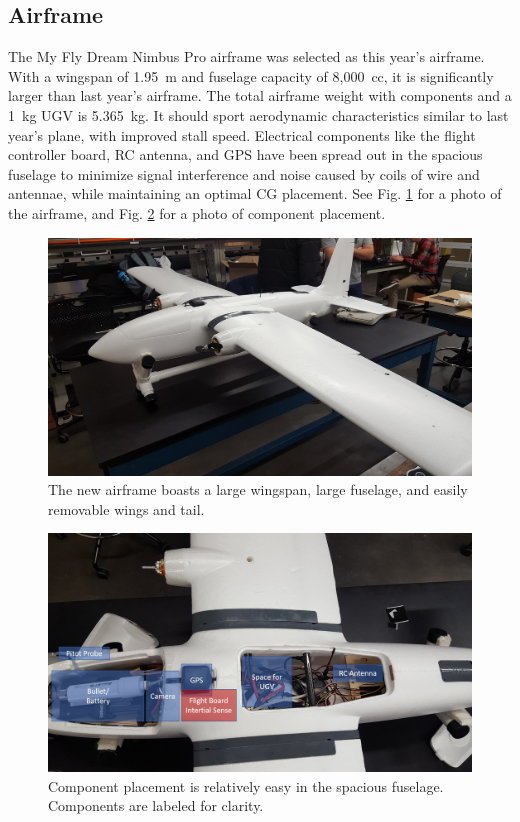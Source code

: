 \documentclass[]{auvsi_doc}
\begin{document}
\subsection{Airframe}
The My Fly Dream Nimbus Pro airframe was selected as this year's airframe. With a wingspan of 1.95~m and fuselage capacity of 8,000~cc, it is significantly larger than last year's airframe. The total airframe weight with components and a 1~kg UGV is 5.365~kg. It should sport aerodynamic characteristics similar to last year's plane, with improved stall speed. Electrical components like the flight controller board, RC antenna, and GPS have been spread out in the spacious fuselage to minimize signal interference and noise caused by coils of wire and antennae, while maintaining an optimal CG placement. See Fig. \ref{airframe} for a photo of the airframe, and Fig. \ref{components} for a photo of component placement.
\begin{figure}[h!]
	\includegraphics[scale=0.6]{figs/airframe.jpg}
	\centering
	\caption{The new airframe boasts a large wingspan, large fuselage, and easily removable wings and tail.}
	\label{airframe}
\end{figure}
\begin{figure}[h!]
	\includegraphics[scale=0.4]{figs/ComponentPlacement.png}
	\centering
	\caption{Component placement is relatively easy in the spacious fuselage. Components are labeled for clarity.}
	\label{components}
\end{figure}
\end{document}
